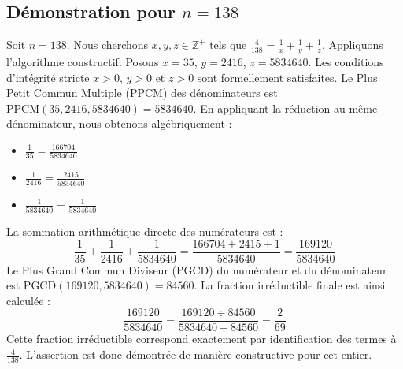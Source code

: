 \documentclass[11pt,a4paper]{article}
\begin{document}
\subsection{Démonstration pour $n = 138$}
Soit $n = 138$. Nous cherchons $x, y, z \in \mathbb{Z}^{+}$ tels que $\frac{4}{138} = \frac{1}{x} + \frac{1}{y} + \frac{1}{z}$.
Appliquons l'algorithme constructif. Posons $x = 35$, $y = 2416$, $z = 5834640$.
Les conditions d'intégrité stricte $x > 0$, $y > 0$ et $z > 0$ sont formellement satisfaites.
Le Plus Petit Commun Multiple (PPCM) des dénominateurs est $\text{PPCM}(35, 2416, 5834640) = 5834640$.
En appliquant la réduction au même dénominateur, nous obtenons algébriquement :
\begin{itemize}
    \item $\frac{1}{35} = \frac{166704}{5834640}$
    \item $\frac{1}{2416} = \frac{2415}{5834640}$
    \item $\frac{1}{5834640} = \frac{1}{5834640}$
\end{itemize}
La sommation arithmétique directe des numérateurs est :
$$ \frac{1}{35} + \frac{1}{2416} + \frac{1}{5834640} = \frac{166704 + 2415 + 1}{5834640} = \frac{169120}{5834640} $$
Le Plus Grand Commun Diviseur (PGCD) du numérateur et du dénominateur est $\text{PGCD}(169120, 5834640) = 84560$.
La fraction irréductible finale est ainsi calculée :
$$ \frac{169120}{5834640} = \frac{169120 \div 84560}{5834640 \div 84560} = \frac{2}{69} $$
Cette fraction irréductible correspond exactement par identification des termes à $\frac{4}{138}$. L'assertion est donc démontrée de manière constructive pour cet entier.
\end{document}
